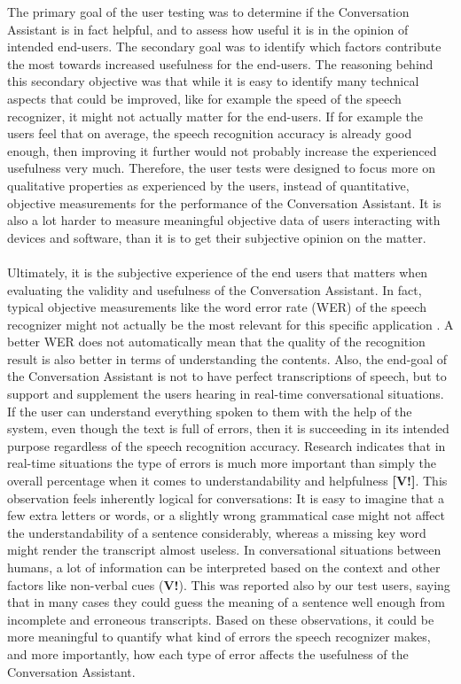 \documentclass[english, 12pt, a4paper, pdftex, elec, utf8]{aaltothesis}
\begin{document}
The primary goal of the user testing was to determine if the Conversation Assistant is in fact helpful, and to assess how useful it is in the opinion of intended end-users. The secondary goal was to identify which factors contribute the most towards increased usefulness for the end-users. The reasoning behind this secondary objective was that while it is easy to identify many technical aspects that could be improved, like for example the speed of the speech recognizer, it might not actually matter for the end-users. If for example the users feel that on average, the speech recognition accuracy is already good enough, then improving it further would not probably increase the experienced usefulness very much. Therefore, the user tests were designed to focus more on qualitative properties as experienced by the users, instead of quantitative, objective measurements for the performance of the Conversation Assistant. It is also a lot harder to measure meaningful objective data of users interacting with devices and software, than it is to get their subjective opinion on the matter. \\\\
Ultimately, it is the subjective experience of the end users that matters when evaluating the validity and usefulness of the Conversation Assistant. In fact, typical objective measurements like the word error rate (WER) of the speech recognizer might not actually be the most relevant for this specific application \cite{wang2003word}. A better WER does not automatically mean that the quality of the recognition result is also better in terms of understanding the contents. Also, the end-goal of the Conversation Assistant is not to have perfect transcriptions of speech, but to support and supplement the users hearing in real-time conversational situations. If the user can understand everything spoken to them with the help of the system, even though the text is full of errors, then it is succeeding in its intended purpose regardless of the speech recognition accuracy. Research indicates that in real-time situations the type of errors is much more important than simply the overall percentage when it comes to understandability and helpfulness \textbf{[V!]}. This observation feels inherently logical for conversations: It is easy to imagine that a few extra letters or words, or a slightly wrong grammatical case might not affect the understandability of a sentence considerably, whereas a missing key word might render the transcript almost useless. In conversational situations between humans, a lot of information can be interpreted based on the context and other factors like non-verbal cues (\textbf{V!}). This was reported also by our test users, saying that in many cases they could guess the meaning of a sentence well enough from incomplete and erroneous transcripts. Based on these observations, it could be more meaningful to quantify what kind of errors the speech recognizer makes, and more importantly, how each type of error affects the usefulness of the Conversation Assistant. \\
\end{document}
